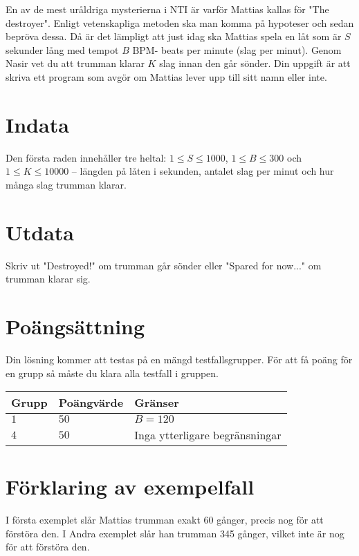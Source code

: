 En av de mest uråldriga mysterierna i NTI är varför Mattias kallas för "The destroyer". Enligt vetenskapliga metoden ska man komma på hypoteser och sedan bepröva dessa.
Då är det lämpligt att just idag ska Mattias spela en låt som är $S$ sekunder lång med tempot $B$ BPM- beats per minute (slag per minut). Genom Nasir vet du att trumman klarar 
$K$ slag innan den går sönder. Din uppgift är att skriva ett program som avgör om Mattias lever upp till sitt namn eller inte.


\section*{Indata}
Den första raden innehåller tre heltal: $1\leq S \leq 1000$, $1 \leq B \leq 300$ och $1 \leq K \leq 10000$ -- längden på låten i sekunden, antalet slag per minut och hur många slag trumman klarar. 

\section*{Utdata}
Skriv ut "Destroyed!" om trumman går sönder eller "Spared for now..." om trumman klarar sig.

\section*{Poängsättning}
Din lösning kommer att testas på en mängd testfallsgrupper.
För att få poäng för en grupp så måste du klara alla testfall i gruppen.

\noindent
\begin{tabular}{| l | l | p{12cm} |}
  \hline
  Grupp & Poängvärde & Gränser \\ \hline
  $1$   & $50$       & $B=120$ \\ \hline
  $4$   & $50$       & Inga ytterligare begränsningar  \\ \hline
\end{tabular}

\section*{Förklaring av exempelfall}
I första exemplet slår Mattias trumman exakt 60 gånger, precis nog för att förstöra den.
I Andra exemplet slår han trumman 345 gånger, vilket inte är nog för att förstöra den.